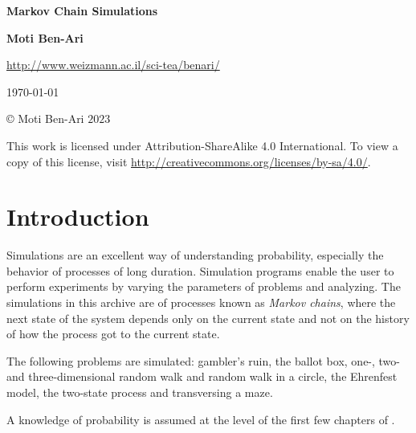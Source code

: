 \documentclass[11pt,a4paper]{article}
\begin{document}

\thispagestyle{empty}

\begin{center}
\textbf{\LARGE Markov Chain Simulations}

\bigskip
\bigskip
\bigskip

\textbf{\Large Moti Ben-Ari}

\bigskip

\url{http://www.weizmann.ac.il/sci-tea/benari/}

\bigskip
\bigskip
\bigskip

\today

\end{center}

\vfill

\begin{center}
\copyright{} Moti Ben-Ari $2023$
 \end{center}
 
\begin{small}
This work is licensed under Attribution-ShareAlike 4.0 International. To view a copy of this license, visit \url{http://creativecommons.org/licenses/by-sa/4.0/}.
\end{small}
\newpage

\tableofcontents

\newpage



\section{Introduction}

Simulations are an excellent way of understanding probability, especially the behavior of processes of long duration. Simulation programs enable the user to perform experiments by varying the parameters of problems and analyzing. The simulations in this archive are of processes known as \emph{Markov chains}, where the next state of the system depends only on the current state and not on the history of how the process got to the current state. 

The following problems are simulated: gambler's ruin, the ballot box, one-, two- and three-dimensional random walk and random walk in a circle, the Ehrenfest model, the two-state process and transversing a maze.

A knowledge of probability is assumed at the level of the first few chapters of \cite{BW,ross}. 
\end{document}
